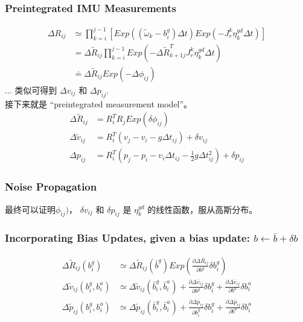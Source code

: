 \documentclass[10pt,a4paper]{article}
\begin{document}
\subsubsection{Preintegrated IMU Measurements}
\begin{subequations}
	\begin{align}
	\Delta R_{ij} &\simeq \prod_{k=i}^{j-1}[Exp((\tilde{\omega}_k - b_i^g) \Delta t) 
	Exp(-J_r^k \eta_k^{gd}\Delta t)]\\
	&= \Delta \tilde{R}_{ij} \prod_{k=i}^{j-1}Exp(-\Delta \tilde{R}_{k+1j}^{T} J_r^k \eta_k^{gd} \Delta t)\\
	&\doteq \Delta \tilde{R}_{ij} Exp(-\Delta \phi_{ij})
	\end{align}
\end{subequations}
... 类似可得到 $\Delta v_{ij}$ 和 $\Delta p_{ij}$.\\
接下来就是 “preintegrated measurement model”。
\begin{subequations}
	\begin{align}
		\Delta \tilde{R}_{ij} &= R_i^T R_j Exp(\delta \phi_{ij}) \\
		\Delta \tilde{v}_{ij} &= R_i^T(v_j - v_i -g \Delta t_{ij}) + \delta v_{ij}\\
		\Delta p_{ij}         &= R_i^T (p_j - p_i - v_i\Delta t_{ij} - \frac{1}{2} g\Delta t_{ij}^2) + \delta p_{ij}
	\end{align}
\end{subequations}

\subsubsection{Noise Propagation}
最终可以证明$\phi_{ij})$， $\delta v_{ij}$ 和 $\delta p_{ij}$ 是 $\eta_k^{gd}$ 的线性函数，服从高斯分布。

\subsubsection{Incorporating Bias Updates, given a bias update: $b \leftarrow \bar{b} + \delta b$}
\begin{subequations}
	\begin{align}
	\Delta \tilde{R}_{ij}(b_i^g)  &\simeq \Delta \tilde{R}_{ij}(\bar{b}^g) 
	Exp(\frac{\partial \Delta \bar{R}_{ij}}{\partial b^g} \delta b_i^g)\\
	\Delta \tilde{v}_{ij}(b_i^g, b_i^a) &\simeq \Delta \tilde{v}_{ij}(\bar{b}_i^g, \bar{b}_i^a) + 
	\frac{\partial \Delta \bar{v}_{ij}}{\partial b^g} \delta b_i^g + 
	\frac{\partial \Delta \bar{v}_{ij}}{\partial b^a} \delta b_i^a\\
	 \Delta \tilde{p}_{ij}(b_i^g, b_i^a) &\simeq \Delta \tilde{p}_{ij}(\bar{b}_i^g, \bar{b}_i^a) +
	 	\frac{\partial \Delta \bar{p}_{ij}}{\partial b_i^g} \delta b_i^g + 
	 \frac{\partial \Delta \bar{p}_{ij}}{\partial b^a} \delta b_i^a\\
	\end{align}	
\end{subequations}
\end{document}
